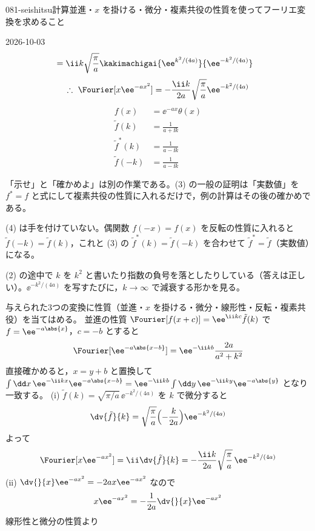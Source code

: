 \documentclass[uplatex,dvipdfmx,a4paper,11pt]{jsarticle}
\begin{document}
\begin{mondai}{081-seishitsu}{計算}{並進・$x$ を掛ける・微分・複素共役の性質を使ってフーリエ変換を求めること}
\begin{kotaeutsushi}{2026-10-03}
\begin{align*}
  &=\ii k\sqrt{\frac{\pi}{a}}\kakimachigai{\ee^{k^{2}/(4a)}}{\ee^{-k^{2}/(4a)}}
\end{align*}
\[ \therefore\ \Fourier[x\ee^{-ax^{2}}]=-\frac{\ii k}{2a}\sqrt{\frac{\pi}{a}}\ee^{-k^{2}/(4a)} \]
\begin{align*}
  f(x)&=\ee^{-ax}\theta(x)\\
  \tilde f(k)&=\frac{1}{a+\ii k}\\
  \tilde f^{*}(k)&=\frac{1}{a-\ii k}\\
  \tilde f(-k)&=\frac{1}{a-\ii k}
\end{align*}
\mikai
\end{kotaeutsushi}
\begin{kizuki}
\item 「示せ」と「確かめよ」は別の作業である。(3) の一般の証明は「実数値」を $f^{*}=f$ と式にして複素共役の性質に入れるだけで，例の計算はその後の確かめである。
\item (4) は手を付けていない。偶関数 $f(-x)=f(x)$ を反転の性質に入れると $\tilde f(-k)=\tilde f(k)$，これと (3) の $\tilde f^{*}(k)=\tilde f(-k)$ を合わせて $\tilde f^{*}=\tilde f$（実数値）になる。
\item (2) の途中で $k$ を $k^{2}$ と書いたり指数の負号を落としたりしている（答えは正しい）。$\ee^{-k^{2}/(4a)}$ を写すたびに，$k\to\infty$ で減衰する形かを見る。
\end{kizuki}
\begin{tadashii}
\houshin 与えられた3つの変換に性質（並進・$x$ を掛ける・微分・線形性・反転・複素共役）を当てはめる。
\keisan
{} 並進の性質 $\Fourier[f(x+c)]=\ee^{\ii kc}\tilde f(k)$ で $f=\ee^{-a\abs{x}}$，$c=-b$ とすると
\[ \Fourier[\ee^{-a\abs{x-b}}]=\ee^{-\ii kb}\frac{2a}{a^{2}+k^{2}} \]
直接確かめると，$x=y+b$ と置換して $\int\dd x\,\ee^{-\ii kx}\ee^{-a\abs{x-b}}=\ee^{-\ii kb}\int\dd y\,\ee^{-\ii ky}\ee^{-a\abs{y}}$ となり一致する。
 (i) $\tilde f(k)=\sqrt{\pi/a}\,\ee^{-k^{2}/(4a)}$ を $k$ で微分すると
\[ \dv{\tilde f}{k}=\sqrt{\frac{\pi}{a}}\Bigl(-\frac{k}{2a}\Bigr)\ee^{-k^{2}/(4a)} \]
よって
\[ \Fourier[x\ee^{-ax^{2}}]=\ii\dv{\tilde f}{k}=-\frac{\ii k}{2a}\sqrt{\frac{\pi}{a}}\,\ee^{-k^{2}/(4a)} \]
(ii) $\dv{}{x}\ee^{-ax^{2}}=-2ax\ee^{-ax^{2}}$ なので
\[ x\ee^{-ax^{2}}=-\frac{1}{2a}\dv{}{x}\ee^{-ax^{2}} \]
線形性と微分の性質より

\end{tadashii}
\end{mondai}
\end{document}

